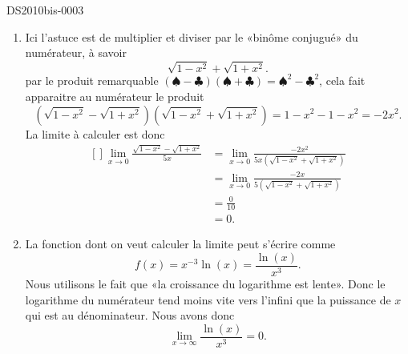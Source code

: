 \begin{corrige}{DS2010bis-0003}
\begin{enumerate}
		\item
			Ici l'astuce est de multiplier et diviser par le «binôme conjugué» du numérateur, à savoir
			\begin{equation}
                          \sqrt{1-x^2}+\sqrt{1+x^2}.
			\end{equation}
                        par le produit remarquable $(\spadesuit-\clubsuit)(\spadesuit+\clubsuit)=\spadesuit^2-\clubsuit^2$, cela fait apparaitre au numérateur le produit
			\begin{equation}
                          (\sqrt{1-x^2}-\sqrt{1+x^2})(\sqrt{1-x^2}+\sqrt{1+x^2})=1-x^2-1-x^2=-2x^2.
			\end{equation}
			 La limite à calculer est donc
			 \begin{equation}
				 \begin{aligned}[]
					\lim_{x\to 0}\frac{\sqrt{1-x^2}-\sqrt{1+x^2}}{5x}&=\lim_{x\to 0}\frac{-2x^2}{5x(\sqrt{1-x^2}+\sqrt{1+x^2})}\\
					&=\lim_{x\to 0}\frac{-2x}{5(\sqrt{1-x^2}+\sqrt{1+x^2})}\\
					&=\frac{0}{10}\\
					&=0.
				 \end{aligned}
			 \end{equation}

		\item
                  La fonction dont on veut calculer la limite peut s'écrire comme 
                  \begin{equation}
                    f(x)=x^{-3}\ln(x)=\frac{\ln(x)}{x^3}.
                  \end{equation}
                  Nous utilisons le fait que «la croissance du logarithme est lente». Donc le logarithme du numérateur tend moins vite vers l'infini que la puissance de $x$ qui est au dénominateur. Nous avons donc
			\begin{equation}
				\lim_{x\to \infty} \frac{ \ln(x) }{ x^{3} }=0.
			\end{equation}
	\end{enumerate}

\end{corrige}
